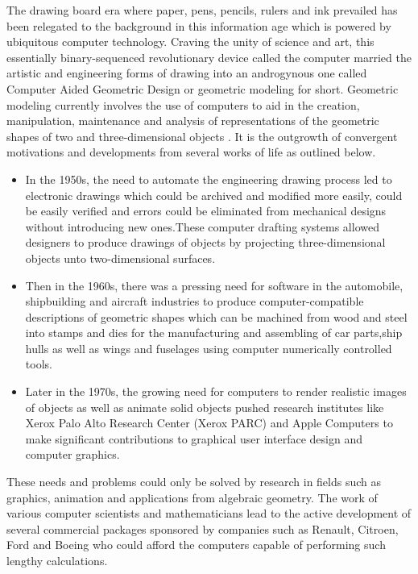\hspace{30}The drawing board era where paper, pens, pencils, rulers and ink  
prevailed has been relegated to the background in this information age which is  
powered by ubiquitous computer technology. Craving the unity of science and  
art, this essentially binary­-sequenced revolutionary device called the computer  
married the artistic and engineering forms of drawing into an androgynous one  
called Computer­ Aided Geometric Design or geometric modeling for short.
Geometric modeling currently involves the use of computers to aid in the  
creation, manipulation, maintenance and analysis of representations of the  
geometric shapes of two and three-­dimensional objects \cite{2}. It is the outgrowth  
of convergent motivations and developments from several works of life as  
outlined below.
\begin{itemize}
\item In the 1950s, the need to automate the engineering drawing process led
to electronic drawings which could be archived and modified more easily,
could be easily verified and errors could be eliminated from mechanical 
designs without introducing new ones.These computer drafting systems
allowed designers to produce drawings of objects by projecting
three-­dimensional objects unto two-­dimensional surfaces.
\item Then in the 1960s, there was a pressing need for software in the
automobile, shipbuilding and aircraft industries to produce
computer-­compatible descriptions of geometric shapes which can be
machined from wood and steel into stamps and dies for the
manufacturing and assembling of car parts,ship hulls as well as wings and  
fuselages using computer numerically controlled tools.
\item Later in the 1970s, the growing need for computers to render realistic
images of objects as well as animate solid objects pushed research
institutes like Xerox Palo Alto Research Center (Xerox PARC) and Apple
Computers to make significant contributions to graphical user­ interface
design and computer graphics.  
\end{itemize}

These needs and problems could only be solved by research in fields such as
graphics, animation and applications from algebraic geometry. The work of
various computer scientists and mathematicians lead to the active development
of several commercial packages sponsored by companies such as Renault,
Citroen, Ford and Boeing who could afford the computers capable of  
performing such lengthy calculations.  


